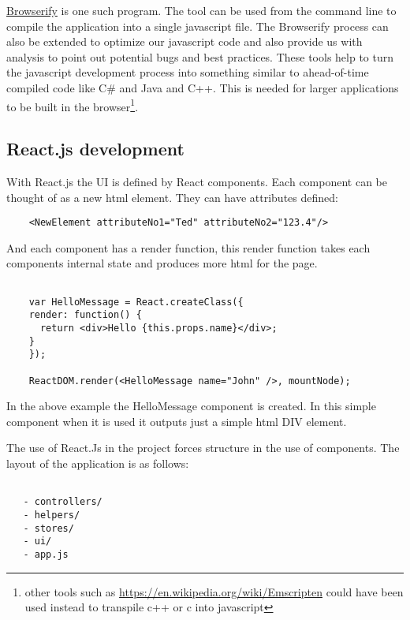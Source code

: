 \href{http://browserify.org/}{Browserify} is one such program. The tool can be
used from the command line to compile the application into a single javascript
file. The Browserify process can also be extended to optimize our javascript
code and also provide us with analysis to point out potential bugs and best
practices. These tools help to turn the javascript development process into
something similar to ahead-of-time compiled code like C\# and Java and C++. This
is needed for larger applications to be built in the browser\footnote{other
tools such as \url{https://en.wikipedia.org/wiki/Emscripten} could have been
used instead to transpile c++ or c into javascript }.

\subsection{React.js development}\label{react.js-development}

With React.js the UI is defined by React components. Each component can
be thought of as a new html element. They can have attributes defined:

\begin{listing}[ht]
  \begin{verbatim}
    <NewElement attributeNo1="Ted" attributeNo2="123.4"/>
  \end{verbatim}
\end{listing}

And each component has a render function, this render function takes
each components internal state and produces more html for the page.


\begin{verbatim}

    var HelloMessage = React.createClass({
    render: function() {
      return <div>Hello {this.props.name}</div>;
    }
    });

    ReactDOM.render(<HelloMessage name="John" />, mountNode);

\end{verbatim}

In the above example the HelloMessage component is created. In this
simple component when it is used it outputs just a simple html DIV
element.

The use of React.Js in the project forces structure in the use of
components. The layout of the application is as follows:

\begin{verbatim}

   - controllers/
   - helpers/ 
   - stores/ 
   - ui/ 
   - app.js

\end{verbatim}

